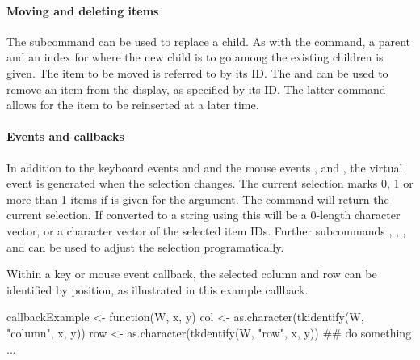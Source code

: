 \paragraph{Moving and deleting items}
The  subcommand can be used to replace a child. As with the  command, a parent and an index for where the new child is to go among the existing children is given. The item to be moved is referred to by its ID. The  and  can be used to remove an item from the display, as specified by its ID. The latter command allows for the item to be reinserted at a later time.

\paragraph{Events and callbacks}
In addition to the keyboard events  and  and the mouse events ,  and , 
the virtual event  is generated when
the selection changes.  The current selection marks 0, 1 or more than
1 items if  is given for the 
argument. The  command will return
the current selection. If converted to a string using
 this will be a 0-length character vector, or a
character vector of the selected item IDs. Further subcommands
, , , and  can be used
to adjust the selection programatically.


Within a key or mouse event callback, the selected column and row can be identified by position, as illustrated in this example callback.
\begin{Schunk}
\begin{Sinput}
 callbackExample <- function(W, x, y) {
   col <- as.character(tkidentify(W, "column", x, y))
   row <- as.character(tkdentify(W, "row", x, y))
   ## do something ...
 }
\end{Sinput}
\end{Schunk}


